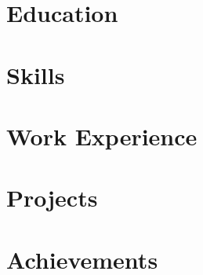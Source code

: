 \documentclass[a4paper,10pt]{article}
\begin{document}


\section{Education}


\section{Skills}


\section{Work Experience}


\section{Projects}


\section{Achievements}



\end{document}
